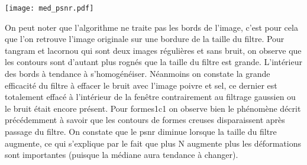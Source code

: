 \documentclass[12pt]{article}
\numberwithin{equation}{section}
\begin{document}
\begin{center}
\texttt{[image: med\_psnr.pdf]}\\
\end{center}

On peut noter que l'algorithme ne traite pas les bords de l'image, c'est pour cela que l'on retrouve l'image originale sur une bordure de la taille du filtre. Pour tangram et lacornou qui sont deux images régulières et sans bruit, on observe que les contours sont d'autant plus rognés que la taille du filtre est grande. L'intérieur des bords à tendance à s'homogénéiser. Néanmoins on constate la grande efficacité du filtre à effacer le bruit avec l'image poivre et sel, ce dernier est totalement effacé à l'intérieur de la fenêtre contrairement au filtrage gaussien ou le bruit était encore présent. Pour formes1c1 on observe bien le phénomène décrit précédemment à savoir que les contours de formes creuses disparaissent après passage du filtre. On constate que le psnr diminue lorsque la taille du filtre augmente, ce qui s'explique par le fait que plus N augmente plus les déformations sont importantes (puisque la médiane aura tendance à changer).
\end{document}
